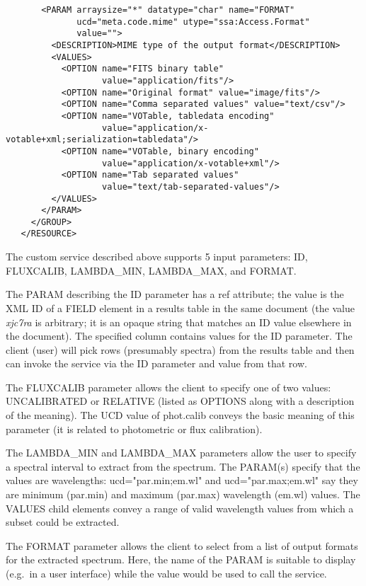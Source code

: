 \documentclass[11pt,a4paper]{ivoa}
\newcommand{\attval}[2]{#1={\allowbreak}{"}#2{"}}
\begin{document}
{\begin{verbatim}
       <PARAM arraysize="*" datatype="char" name="FORMAT"
              ucd="meta.code.mime" utype="ssa:Access.Format"
              value="">
         <DESCRIPTION>MIME type of the output format</DESCRIPTION>
         <VALUES>
           <OPTION name="FITS binary table"
                   value="application/fits"/>
           <OPTION name="Original format" value="image/fits"/>
           <OPTION name="Comma separated values" value="text/csv"/>
           <OPTION name="VOTable, tabledata encoding"
                   value="application/x-votable+xml;serialization=tabledata"/>
           <OPTION name="VOTable, binary encoding"
                   value="application/x-votable+xml"/>
           <OPTION name="Tab separated values"
                   value="text/tab-separated-values"/>
         </VALUES>
       </PARAM>
     </GROUP>
   </RESOURCE>
\end{verbatim}
}

The custom service described above supports 5 input parameters: ID,
FLUXCALIB, LAMBDA\_MIN, LAMBDA\_MAX, and FORMAT.

The PARAM describing the ID parameter has a ref attribute; the value is
the XML ID of a FIELD element in a results table in the same document
(the value {\em xjc7ra\/} is arbitrary;
it is an opaque string that matches
an ID value elsewhere in the document). The specified column contains
values for the ID parameter. The client (user) will pick rows (presumably
spectra) from the results table and then can invoke the service via the
ID parameter and value from that row.

The FLUXCALIB parameter allows the client to specify one of two values:
UNCALIBRATED or RELATIVE (listed as OPTIONS along with a description of
the meaning). The UCD \citep{2005ivoa.spec.0819D} value
of phot.calib conveys the basic meaning
of this parameter (it is related to photometric or flux calibration).

The LAMBDA\_MIN and LAMBDA\_MAX parameters allow the user to specify a
spectral interval to extract from the spectrum. The PARAM(s) specify that
the values are wavelengths:
\attval{ucd}{par.min;em.wl} and
\attval{ucd}{par.max;em.wl}
say they are minimum (par.min) and maximum (par.max) wavelength (em.wl)
values. The VALUES child elements convey a range of valid wavelength
values from which a subset could be extracted.

The FORMAT parameter allows the client to select from a list of output
formats for the extracted spectrum. Here, the name of the PARAM is
suitable to display (e.g.\ in a user interface) while the value would be
used to call the service.
\end{document}

